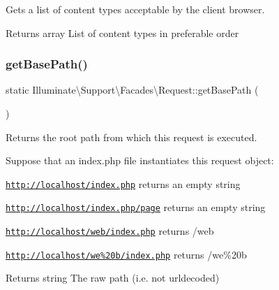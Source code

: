 Gets a list of content types acceptable by the client browser.

\begin{DoxyReturn}{Returns}
array List of content types in preferable order 
\end{DoxyReturn}
\mbox{\label{class_illuminate_1_1_support_1_1_facades_1_1_request_a7ff313f9f7aa4c84a15e5f5378ea0b6f}} 
\subsubsection{\texorpdfstring{get\+Base\+Path()}{getBasePath()}}
{\footnotesize\ttfamily static Illuminate\textbackslash{}\+Support\textbackslash{}\+Facades\textbackslash{}\+Request\+::get\+Base\+Path (\begin{DoxyParamCaption}{ }\end{DoxyParamCaption})\hspace{0.3cm}{\ttfamily [static]}}

Returns the root path from which this request is executed.

Suppose that an index.\+php file instantiates this request object\+:


\begin{DoxyItemize}
\item \href{http://localhost/index.php}{\tt http\+://localhost/index.\+php} returns an empty string
\item \href{http://localhost/index.php/page}{\tt http\+://localhost/index.\+php/page} returns an empty string
\item \href{http://localhost/web/index.php}{\tt http\+://localhost/web/index.\+php} returns \textquotesingle{}/web\textquotesingle{}
\item \href{http://localhost/we%20b/index.php}{\tt http\+://localhost/we\%20b/index.\+php} returns \textquotesingle{}/we\%20b\textquotesingle{}
\end{DoxyItemize}

\begin{DoxyReturn}{Returns}
string The raw path (i.\+e. not urldecoded) 
\end{DoxyReturn}
\mbox{\label{class_illuminate_1_1_support_1_1_facades_1_1_request_a8aa479bbfa1d5f2e34b783561a674ee9}} 
